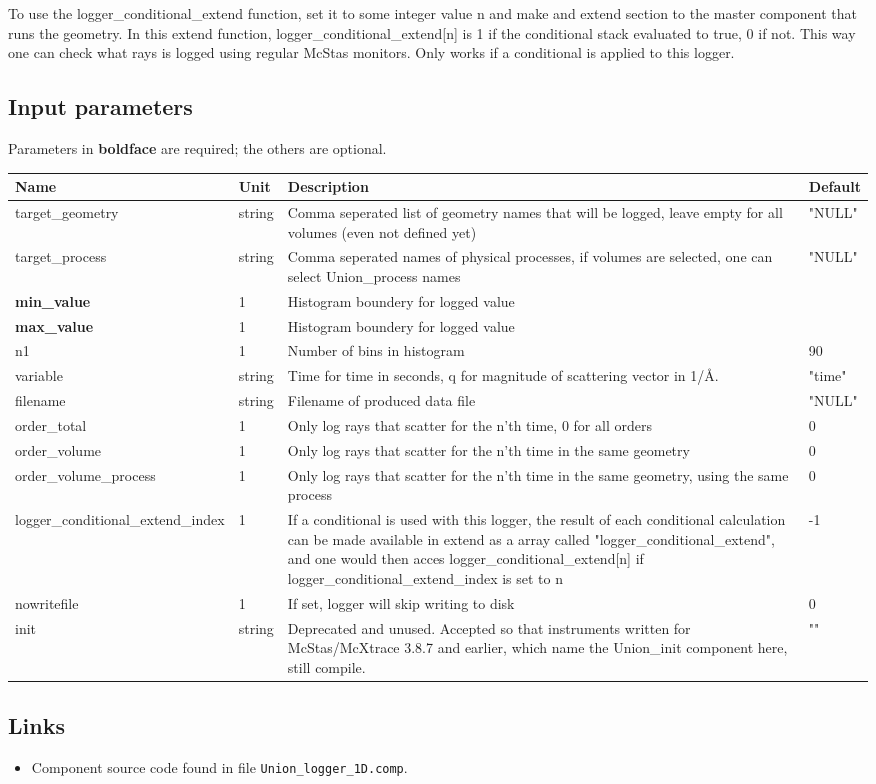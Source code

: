 To use the logger\_conditional\_extend function, set it to some integer value n and make and extend section to the master component that runs the geometry. In this extend function, logger\_conditional\_extend[n] is 1 if the conditional stack evaluated to true, 0 if not. This way one can check what rays is logged using regular McStas monitors. Only works if a conditional is applied to this logger.

\subsection*{Input parameters}
Parameters in \textbf{boldface} are required; the others are optional.

\begin{longtable}{p{}p{}p{}p{}}
\toprule
\textbf{Name} & \textbf{Unit} & \textbf{Description} & \textbf{Default} \\
\midrule
\endhead
target\_geometry & string & Comma seperated list of geometry names that will be logged, leave empty for all volumes (even not defined yet) & "NULL" \\
target\_process & string & Comma seperated names of physical processes, if volumes are selected, one can select Union\_process names & "NULL" \\
\textbf{min\_value} & 1 & Histogram boundery for logged value &  \\
\textbf{max\_value} & 1 & Histogram boundery for logged value &  \\
n1 & 1 & Number of bins in histogram & 90 \\
variable & string & Time for time in seconds, q for magnitude of scattering vector in 1/\AA{}. & "time" \\
filename & string & Filename of produced data file & "NULL" \\
order\_total & 1 & Only log rays that scatter for the n'th time, 0 for all orders & 0 \\
order\_volume & 1 & Only log rays that scatter for the n'th time in the same geometry & 0 \\
order\_volume\_process & 1 & Only log rays that scatter for the n'th time in the same geometry, using the same process & 0 \\
logger\_conditional\_extend\_index & 1 & If a conditional is used with this logger, the result of each conditional calculation can be made available in extend as a array called "logger\_conditional\_extend", and one would then acces logger\_conditional\_extend[n] if logger\_conditional\_extend\_index is set to n & -1 \\
nowritefile & 1 & If set, logger will skip writing to disk & 0 \\
init & string & Deprecated and unused. Accepted so that instruments written for McStas/McXtrace 3.8.7 and earlier, which name the Union\_init component here, still compile. & "" \\
\bottomrule
\end{longtable}

\subsection*{Links}
\begin{itemize}
  \item Component source code found in file \texttt{Union\_logger\_1D.comp}.
\end{itemize}

